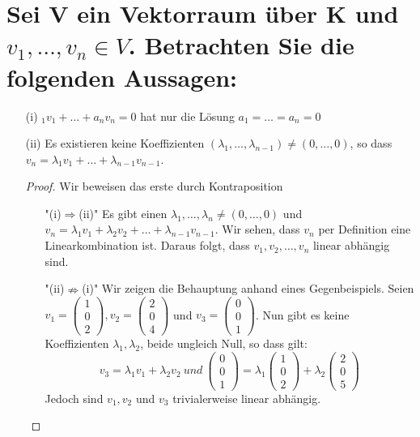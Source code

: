 \documentclass{article}
\begin{document}
    \section{Sei V ein Vektorraum über K und $v_1,\dots,v_n\in V$. Betrachten Sie die folgenden Aussagen:}
    \begin{enumerate}
        \item[(i)] $_1v_1+\dots+a_nv_n=0$ hat nur die Lösung $a_1 = \dots = a_n = 0$
        \item[(ii)] Es existieren keine Koeffizienten $(\lambda_1,\dots,\lambda_{n-1})\neq(0,\dots,0)$, 
        so dass $v_n = \lambda_1v_1 + \dots+\lambda_{n-1}v_{n-1}$.
        \begin{proof} Wir beweisen das erste durch Kontraposition
            \begin{enumerate}
                \item["(i)$\Rightarrow$(ii)"]
                Es gibt einen $\lambda_1,\dots,\lambda_n \neq (0,\dots,0)$ und 
                $v_n=\lambda_1v_1+\lambda_2v_2+\dots+\lambda_{n-1}v_{n-1}$. Wir sehen, 
                dass $v_n$ per Definition eine Linearkombination ist. Daraus folgt, 
                dass $v_1,v_2,\dots,v_n$ linear abhängig sind.
                \item["(ii)$\nRightarrow$(i)"] Wir zeigen die Behauptung anhand eines Gegenbeispiels.
                \newline
                Seien $v_1=\left(\begin{array}{c}1\\0\\2\end{array}\right), v_2=\left(\begin{array}{c}2\\0\\4\end{array}\right)$ und 
                $v_3=\left(\begin{array}{c}0\\0\\1\end{array}\right)$.
                \newline
                Nun gibt es keine Koeffizienten $\lambda_1,\lambda_2$, beide ungleich Null, so dass gilt:
                \[v_3 = \lambda_1v_1+\lambda_2v_2 \ und\ \left(\begin{array}{c}0\\0\\1\end{array}\right) = 
                \lambda_1\left(\begin{array}{c}1\\0\\2\end{array}\right)+
                \lambda_2\left(\begin{array}{c}2\\0\\5\end{array}\right)\]
                Jedoch sind $v_1, v_2$ und $v_3$ trivialerweise linear abhängig.
            \end{enumerate}
        \end{proof}
    \end{enumerate}
\end{document}
